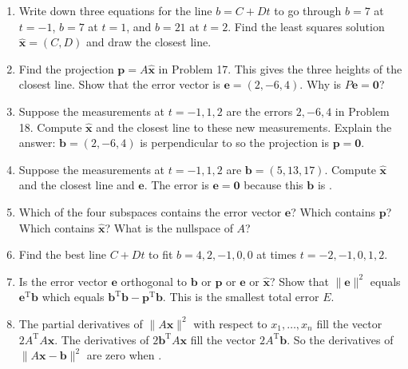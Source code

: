 \documentclass[14pt, a4paper]{article}
\begin{document}
\begin{enumerate}[resume]
    \item Write down three equations for the line $b = C + Dt$ to go through $b = 7$ at $t = -1$, $b = 7$ at $t = 1$, and $b = 21$ at $t = 2$. Find the least squares solution $\widehat{\boldsymbol{x}} = (C, D)$ and draw the closest line.

    \item Find the projection $\boldsymbol{p} = A\widehat{\boldsymbol{x}}$ in Problem 17. This gives the three heights of the closest line. Show that the error vector is $\boldsymbol{e} = (2, -6, 4)$. Why is $P\boldsymbol{e} = \mathbf{0}$?

    \item Suppose the measurements at $t = -1, 1, 2$ are the errors $2, -6, 4$ in Problem 18. Compute $\widehat{\boldsymbol{x}}$ and the closest line to these new measurements. Explain the answer: $\boldsymbol{b} = (2, -6, 4)$ is perpendicular to \underline{\hspace{2cm}} so the projection is $\boldsymbol{p} = \mathbf{0}$.

    \item Suppose the measurements at $t = -1, 1, 2$ are $\boldsymbol{b} = (5, 13, 17)$. Compute $\widehat{\boldsymbol{x}}$ and the closest line and $\boldsymbol{e}$. The error is $\boldsymbol{e} = \mathbf{0}$ because this $\boldsymbol{b}$ is \underline{\hspace{2cm}}.

    \item Which of the four subspaces contains the error vector $\boldsymbol{e}$? Which contains $\boldsymbol{p}$? Which contains $\widehat{\boldsymbol{x}}$? What is the nullspace of $A$?

    \item Find the best line $C + Dt$ to fit $b = 4, 2, -1, 0, 0$ at times $t = -2, -1, 0, 1, 2$.

    \item Is the error vector $\boldsymbol{e}$ orthogonal to $\boldsymbol{b}$ or $\boldsymbol{p}$ or $\boldsymbol{e}$ or $\widehat{\boldsymbol{x}}$? Show that $\|\boldsymbol{e}\|^2$ equals $\boldsymbol{e}^{\mathrm{T}}\boldsymbol{b}$ which equals $\boldsymbol{b}^{\mathrm{T}}\boldsymbol{b} - \boldsymbol{p}^{\mathrm{T}}\boldsymbol{b}$. This is the smallest total error $E$.

    \item The partial derivatives of $\|A\boldsymbol{x}\|^2$ with respect to $x_1, \dots, x_n$ fill the vector $2A^{\mathrm{T}}A\boldsymbol{x}$. The derivatives of $2\boldsymbol{b}^{\mathrm{T}}A\boldsymbol{x}$ fill the vector $2A^{\mathrm{T}}\boldsymbol{b}$. So the derivatives of $\|A\boldsymbol{x} - \boldsymbol{b}\|^2$ are zero when \underline{\hspace{2cm}}.
\end{enumerate}
\end{document}
